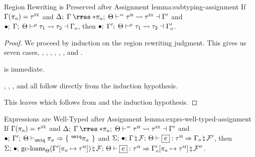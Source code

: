 \begin{oxlemma}{Region Rewriting is Preserved after Assignment}
  {lemma:subtyping-assignment} If
  $\Gamma(\pi_a) = \tau^\textsc{sx}$
  and $\oxtunify[\oxnoop]{\oxtvarctx}{\oxkontctx}{
    \oxrsub{\oxvarctx}{\oxderef{\oxplace_a}}
  }{\oxsitype}{\oxsxtype}{\oxvarctx^\prime}$ and
  $\bullet; \; \Gamma; \; \Theta \vdash^{\mu} \tau_1 \leadsto \tau_2 \dashv \Gamma_o$, then
  $\bullet; \; \Gamma^\prime; \; \Theta \vdash^{\mu} \tau_1 \leadsto \tau_2 \dashv 
    \Gamma^\prime_o
 $.
\end{oxlemma}

\begin{proof}
  We proceed by induction on the region rewriting judgment. This gives us seven
  cases, , , ,
  , , , and
  .

   is immediate.

  , , ,  and
   all follow directly from the induction hypothesis.

  This leaves  which follows from
   and the induction hypothesis.
\end{proof}

\begin{oxlemma}{Expressions are Well-Typed after Assignment}
  {lemma:exprs-well-typed-assignment}
  If $\Gamma(\pi_a) = \tau^\textsc{sx}$
  and $\oxtunify[\oxnoop]{\oxtvarctx}{\oxkontctx}{
    \oxrsub{\oxvarctx}{\oxderef{\oxplace_a}}
  }{\oxsitype}{\oxsxtype}{\oxvarctx^\prime}$ and
  $\bullet; \: \Gamma^\prime; \: \Theta \vdash_{\mathtt{uniq}} \pi_a \Rightarrow 
    \{ \: \,^{\mathtt{uniq}}\pi_a\, \: \}
  $ and
  $\oxtypjudge{\oxglobalctx}{\oxemptyctx}{\oxkontctx}{
    \oxnewframe{\oxvarctx}{\oxframe}
  }{\oxexpr}{\oxsitype}{\oxnewframe{\oxvarctx_o}{\oxframe^\prime}}$, then
  $\oxtypjudge{\oxglobalctx}{\oxemptyctx}{\oxkontctx}{
    \oxnewframe{
      \oxgcloans{\oxkontctx}{\oxtupdate{\oxvarctx^\prime}{\oxplace_a}{\oxsitype}}
    }{\oxframe}
  }{\oxexpr}{\oxsitype}{
    \oxnewframe{
      \oxtupdate{\oxvarctx^\prime_o}{\oxplace_a}{\oxsitype}
    }{\oxframe^{\prime\prime}}
  }$.
\end{oxlemma}

